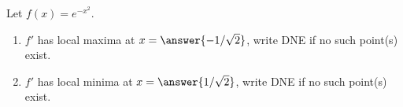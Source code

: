 \documentclass{ximera}
\author{Gregory Hartman \and Matthew Carr}
\begin{document}
\begin{exercise}






Let $f(x)=e^{-x^2}$.
\begin{enumerate}
\item		$f'$ has local maxima at $x=\answer{-1/\sqrt{2}}$, write DNE if no such point(s) exist.
\item		$f'$ has local minima at $x=\answer{1/\sqrt{2}}$, write DNE if no such point(s) exist.
\end{enumerate}

\end{exercise}
\end{document}
